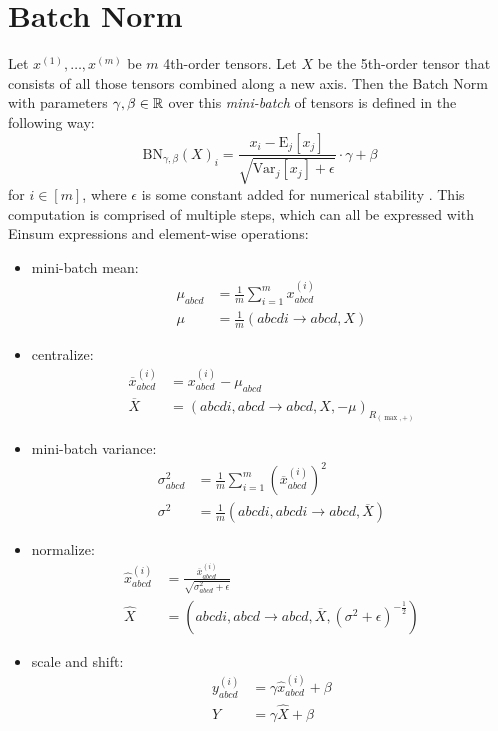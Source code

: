 \section{Batch Norm}
Let $x^{(1)},\dots,x^{(m)}$ be $m$ 4th-order tensors.
Let $X$ be the 5th-order tensor that consists of all those tensors combined along a new axis.
Then the Batch Norm with parameters $\gamma,\beta \in \mathbb{R}$ over this \textit{mini-batch} of tensors is defined in the following way:
$$\text{BN}_{\gamma,\beta}(X)_i = \frac{x_i - \text{E}_j[x_j]}{\sqrt{\text{Var}_j[x_j] + \epsilon}} \cdot \gamma + \beta$$
for $i \in [m]$, where $\epsilon$ is some constant added for numerical stability \cite{Ioffe2015}.
This computation is comprised of multiple steps, which can all be expressed with Einsum expressions and element-wise operations:
\begin{itemize}
    \item mini-batch mean:
          \begin{align*}
              \mu_{abcd} & = \frac{1}{m} \sum\limits_{i = 1}^{m} x^{(i)}_{abcd} \\
              \mu        & = \frac{1}{m} (abcdi \rightarrow abcd, X)
          \end{align*}
    \item centralize:
          \begin{align*}
              \overline{x}^{(i)}_{abcd} & = x^{(i)}_{abcd} - \mu_{abcd}                            \\
              \overline{X}              & = (abcdi, abcd \rightarrow abcd, X, -\mu)_{R_{(\max,+)}}
          \end{align*}
    \item mini-batch variance:
          \begin{align*}
              \sigma^2_{abcd} & = \frac{1}{m} \sum\limits_{i = 1}^{m} \left(\overline{x}^{(i)}_{abcd}\right)^2 \\
              \sigma^2        & = \frac{1}{m} (abcdi,abcdi \rightarrow abcd, \overline{X})
          \end{align*}
    \item normalize:
          \begin{align*}
              \hat{x}^{(i)}_{abcd} & = \frac{\overline{x}^{(i)}_{abcd}}{\sqrt{\sigma^2_{abcd} + \epsilon}}                \\
              \hat{X}              & = (abcdi, abcd \rightarrow abcd, \overline{X}, (\sigma^2 + \epsilon)^{-\frac{1}{2}})
          \end{align*}
    \item scale and shift:
          \begin{align*}
              y^{(i)}_{abcd} & = \gamma \hat{x}^{(i)}_{abcd} + \beta \\
              Y              & = \gamma \hat{X} + \beta
          \end{align*}
\end{itemize}

